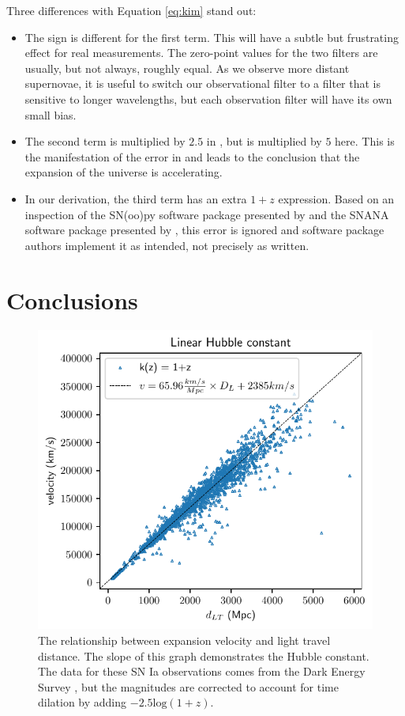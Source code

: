 Three differences with Equation \ref{eq:kim} stand out:

\begin{itemize}
  \item The sign is different for the first term. This will have a subtle but
  frustrating effect for real measurements. The zero-point values for the two
  filters are usually, but not always, roughly equal. As we observe more
  distant supernovae, it is useful to switch our observational filter to a
  filter that is sensitive to longer wavelengths, but each observation filter will
  have its own small bias.

  \item The second term is multiplied by $2.5$ in \citet{kim1996}, but is
  multiplied by $5$ here. This is the manifestation of the error in
  \citet{tolman1930} and leads to the conclusion that the expansion of the
  universe is accelerating.

  \item In our derivation, the third term has an extra $1 + z$ expression.
  Based on an inspection of the SN(oo)py software package presented by
  \citet{burns2010} and the SNANA software package presented by
  \citet{kessler2009}, this error is ignored and software package authors
  implement it as intended, not precisely as written.
\end{itemize}

\section{Conclusions}

\begin{figure}
  \includegraphics[width=\columnwidth]{velocity_vs_distance.pdf}
  \caption{The relationship between expansion velocity and light travel
  distance. The slope of this graph demonstrates the Hubble constant. The data
  for these SN Ia observations comes from the Dark Energy Survey
  \citep{vincenzi2024}, but the magnitudes are corrected to account for time
  dilation by adding ${-2.5 \text{log}(1 + z)}$.
  }
\label{fig:expansion}
\end{figure}

